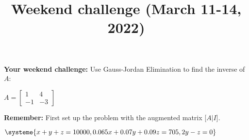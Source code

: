 \documentclass{exam}
\title{Weekend challenge (March 11-14, 2022)  }
\author{  }
\begin{document}
\maketitle
\thispagestyle{empty}

\textbf{Your weekend challenge: } Use Gauss-Jordan Elimination to find the inverse of $A$:

$
A=
\begin{bmatrix}
1 & 4 \\
-1 & -3
\end{bmatrix}
$

\textbf{Remember: } First set up the problem with the augmented matrix [$A | I$].

\vspace{1cm}

$
\systeme{
x + y + z = 10000,
0.065x + 0.07y + 0.09z = 705,
2y  - z = 0
}
$
\thispagestyle{empty}
\end{document}
